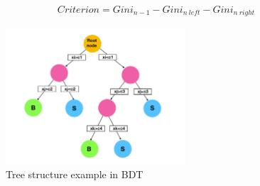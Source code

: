 \begin{align}\label{Equ.BDTtreecriterion} 
Criterion=Gini_{n-1}-Gini_{n \ left}-Gini_{n \ right}
\end{align}


\begin{figure}[!tbp] 
\centering
\includegraphics[width=0.6\textwidth]{chapter7/BDT_tree_show.pdf}
\caption{Tree structure example in BDT}
\label{fig:BDTtreestructure}
\end{figure}

